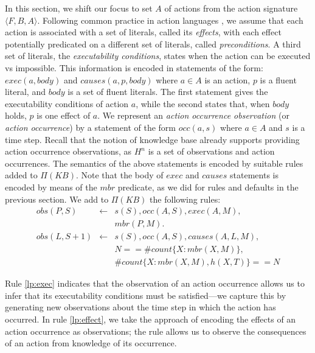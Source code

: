 \documentclass{article}
\begin{document}
In this section, we shift our focus to set $A$ of actions from the action signature $\langle F, B, A \rangle$. Following common practice in action languages \cite{GelfondL98}, we assume that each action is  associated with a set of literals, called its \emph{effects}, with each effect potentially predicated on a different set of literals, called \emph{preconditions}. A third set of literals, the \emph{executability conditions}, states when the action can be executed vs impossible. This information is encoded in statements of the form: 
$exec(a,body)$ and $causes(a,p,body)$ 
%
where $a \in A$ is an action, $p$ is a fluent literal, and $body$ is a set of fluent literals. 
 The first statement gives the executability conditions of action $a$, while the second states that, when $body$ holds, $p$ is one effect of $a$. We represent an \emph{action occurrence observation} (or {\em action occurrence}) by a statement of the form
 $occ(a,s)$
where $a\in A$ and $s$ is a time step. Recall that the notion of knowledge base already supports providing action occurrence observations, as  $H^{n}$ is a set of observations and action occurrences. The semantics of the above statements is encoded by suitable rules added to $\Pi(KB)$. 
 Note that the body of $exec$ and $causes$ statements is encoded by means of the $mbr$ predicate, as we did for rules and defaults in the previous section. 
We add to $\Pi(KB)$ the following rules:
%
\begin{eqnarray}
obs(P, S)  & \leftarrow & s(S), occ(A, S), exec(A, M), \label{lp:exec} \\
& & mbr(P, M).  \nonumber    \\ 
obs(L, S+1) & \leftarrow & s(S),     occ(A, S), causes(A, L, M),\\
& &  N  = =\# count \{X : mbr(X, M)\},  \label{lp:effect} \nonumber\\
& & \# count \{X : mbr(X, M),  h(X, T) \} == N  \nonumber
\end{eqnarray} 

Rule \eqref{lp:exec} indicates that the observation of an action occurrence allows us to infer that its executability conditions must be satisfied---we capture this by generating new observations about the time step in which the action has occurred.
In rule \eqref{lp:effect}, we take the approach of encoding the effects of an action occurrence as observations; the rule allows us to observe the consequences of an action from knowledge of its occurrence.
\end{document}
